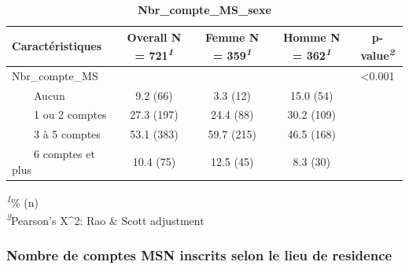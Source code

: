 \documentclass[
]{article}
\begin{document}
\newpage
\begin{table}[!t]
\caption{\label{tab:unnamed-chunk-46}\textbf{Nbr\_compte\_MS\_sexe}} 
\fontsize{12.0pt}{14.4pt}\selectfont
\begin{tabular*}{\linewidth}{@{\extracolsep{\fill}}lcccc}
\toprule
\textbf{Caractéristiques} & \textbf{Overall}  N = 721\textsuperscript{\textit{1}} & \textbf{Femme}  N = 359\textsuperscript{\textit{1}} & \textbf{Homme}  N = 362\textsuperscript{\textit{1}} & \textbf{p-value}\textsuperscript{\textit{2}} \\ 
\midrule\addlinespace[2.5pt]
Nbr\_compte\_MS &  &  &  & <0.001 \\ 
    Aucun & 9.2 (66) & 3.3 (12) & 15.0 (54) &  \\ 
    1 ou 2 comptes & 27.3 (197) & 24.4 (88) & 30.2 (109) &  \\ 
    3 à 5 comptes & 53.1 (383) & 59.7 (215) & 46.5 (168) &  \\ 
    6 comptes et plus & 10.4 (75) & 12.5 (45) & 8.3 (30) &  \\ 
\bottomrule
\end{tabular*}
\begin{minipage}{\linewidth}
\textsuperscript{\textit{1}}\% (n)\\
\textsuperscript{\textit{2}}Pearson's X\^{}2: Rao \& Scott adjustment\\
\end{minipage}
\end{table}

\vspace{1cm}

\hypertarget{nombre-de-comptes-msn-inscrits-selon-le-lieu-de-residence}{%
\subsubsection{Nombre de comptes MSN inscrits selon le lieu de
residence}\label{nombre-de-comptes-msn-inscrits-selon-le-lieu-de-residence}}
\end{document}
